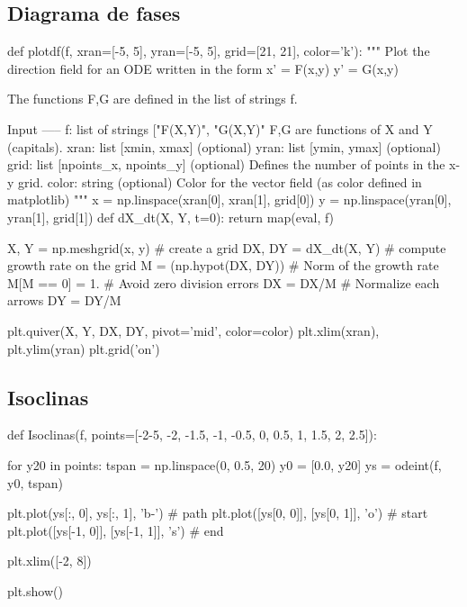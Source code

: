 \documentclass{article}
\begin{document}
            \subsection*{Diagrama de fases}
             \begin{python}
              def plotdf(f, xran=[-5, 5], yran=[-5, 5], grid=[21, 21], color='k'):
              """
              Plot the direction field for an ODE written in the form 
                  x' = F(x,y)
                  y' = G(x,y)

              The functions F,G are defined in the list of strings f.

              Input
              -----
              f:    list of strings ["F(X,Y)", "G(X,Y)"
                    F,G are functions of X and Y (capitals).
              xran: list [xmin, xmax] (optional)
              yran: list [ymin, ymax] (optional)
              grid: list [npoints_x, npoints_y] (optional)
                    Defines the number of points in the x-y grid.
              color: string (optional)
                    Color for the vector field (as color defined in matplotlib)
              """
              x = np.linspace(xran[0], xran[1], grid[0])
              y = np.linspace(yran[0], yran[1], grid[1])
              def dX_dt(X, Y, t=0): return map(eval, f)

              X, Y = np.meshgrid(x, y)  # create a grid
              DX, DY = dX_dt(X, Y)        # compute growth rate on the grid
              M = (np.hypot(DX, DY))      # Norm of the growth rate
              M[M == 0] = 1.             # Avoid zero division errors
              DX = DX/M                   # Normalize each arrows
              DY = DY/M

              plt.quiver(X, Y, DX, DY, pivot='mid', color=color)
              plt.xlim(xran), plt.ylim(yran)
              plt.grid('on')

             \end{python}
      \subsection*{Isoclinas}
      \begin{python}
        def Isoclinas(f, points=[-2-5, -2, -1.5, -1, -0.5,  0, 0.5, 1, 1.5, 2, 2.5]):

          for y20 in points:
              tspan = np.linspace(0, 0.5, 20)
              y0 = [0.0, y20]
              ys = odeint(f, y0, tspan)

              plt.plot(ys[:, 0], ys[:, 1], 'b-')  # path
              plt.plot([ys[0, 0]], [ys[0, 1]], 'o')  # start
              plt.plot([ys[-1, 0]], [ys[-1, 1]], 's')  # end

          plt.xlim([-2, 8])

          plt.show()
      \end{python}
\end{document}
